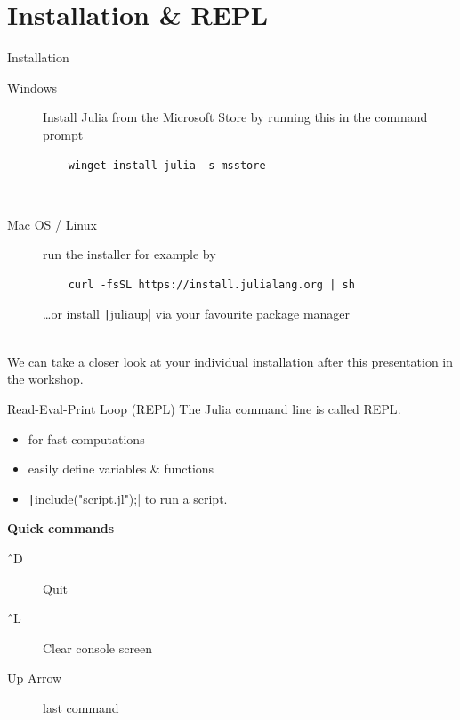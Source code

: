 \documentclass[aspectratio=169, 12pt]{beamer}
\begin{document}
    \section{Installation \& REPL}
    \begin{frame}[fragile]{Installation}
        \begin{description}
            \item[Windows] Install Julia from the Microsoft Store by running this in the command prompt
            \begin{verbatim}
    winget install julia -s msstore
            \end{verbatim}
            \ \\
            \item[Mac OS / Linux] run the installer for example by
            \begin{verbatim}
    curl -fsSL https://install.julialang.org | sh
            \end{verbatim}
            \ldots or install \texttt|juliaup| via your favourite package manager
        \end{description}
        \ \\
        We can take a closer look at your individual installation after this presentation in the workshop.
    \end{frame}
    \begin{frame}{Read-Eval-Print Loop (REPL)}
        The Julia command line is called \alert{REPL}.
        \begin{itemize}
            \item for fast computations
            \item easily define variables \& functions
            \item \texttt|include("script.jl");| to run a script.
        \end{itemize}
        \vspace{\baselineskip}
        \pause
        \alert{\textbf{Quick commands}}
        \begin{description}
            \item[\^\ D] Quit
            \item[\^\ L] Clear console screen
            \item[Up Arrow] last command
        \end{description}
    \end{frame}
\end{document}
